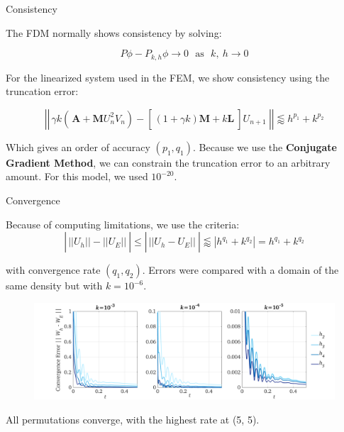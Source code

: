 \documentclass{beamer}
\begin{document}
       \begin{frame}{Consistency}    
       
       The FDM normally shows consistency by solving:
       
       \begin{equation*}
       P\phi - P_{k,h}\phi \rightarrow 0 ~~~\text{as} ~~~ k,~h \rightarrow 0
       \end{equation*}   
       
       For the linearized system used in the FEM, we show consistency using the truncation error:
       
       \begin{equation*}\label{norm}
       \left|\left|\frac{}{} \gamma k\left(\frac{}{}\textbf{A} + \textbf{M}U_{n}^2V_{n}\right) - \left[\frac{}{}(1+\gamma k)\textbf{M} + k \textbf{L}~\right]U_{n+1}~ \right|\right| \lessapprox h^{p_1}+k^{p_2}
       \end{equation*} 
       
       Which gives an order of accuracy $(p_1, q_1)$. Because we use the \textbf{Conjugate Gradient Method}, we can constrain the truncation error to an arbitrary amount. For this model, we used $10^{-20}$.
           
       \end{frame}
   
	   \begin{frame}{Convergence}    
	   
	   Because of computing limitations, we use the criteria:
	      $$\left|\frac{}{} ||U_h|| - ||U_E|| ~\right| \leq \left|\frac{}{} || U_h - U_E|| ~ \right|  \lessapprox \left|h^{q_1} + k^{q_2}\right| = h^{q_1} + k^{q_2}$$
	      
	      with convergence rate $(q_1, q_2)$. Errors were compared with a domain of the same density but with $k=10^{-6}$.
	      \begin{figure}[H]
	      	\includegraphics[width=.8\linewidth, trim=2.5cm 0 .5cm 0,clip]{images/norms_1.png}
	      \end{figure}
      \centering All permutations converge, with the highest rate at (5, 5).
	   
		\end{frame}
		
\end{document}
